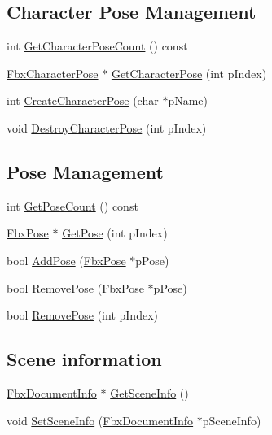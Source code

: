 \subsection*{Character Pose Management}
\begin{DoxyCompactItemize}
\item 
int \hyperlink{class_fbx_scene_a172e1ef47648e5271fc5f7c19e66692f}{Get\+Character\+Pose\+Count} () const
\item 
\hyperlink{class_fbx_character_pose}{Fbx\+Character\+Pose} $\ast$ \hyperlink{class_fbx_scene_a5e8a233241054d2bbe551fec35f7afb6}{Get\+Character\+Pose} (int p\+Index)
\item 
int \hyperlink{class_fbx_scene_aec8727602ce4d2a91448cc42c083e5a3}{Create\+Character\+Pose} (char $\ast$p\+Name)
\item 
void \hyperlink{class_fbx_scene_ac7c105c120c3df3e757354e843c027f1}{Destroy\+Character\+Pose} (int p\+Index)
\end{DoxyCompactItemize}
\subsection*{Pose Management}
\begin{DoxyCompactItemize}
\item 
int \hyperlink{class_fbx_scene_a0bfae5c6b969cfc49a7b0e3c9e190240}{Get\+Pose\+Count} () const
\item 
\hyperlink{class_fbx_pose}{Fbx\+Pose} $\ast$ \hyperlink{class_fbx_scene_a9148979d7728e7256be7ce52cb100558}{Get\+Pose} (int p\+Index)
\item 
bool \hyperlink{class_fbx_scene_a41080e786745c1ebdc1c86a80a8e7961}{Add\+Pose} (\hyperlink{class_fbx_pose}{Fbx\+Pose} $\ast$p\+Pose)
\item 
bool \hyperlink{class_fbx_scene_ad698fe1d231041b3a8ecf5ae3d1e2e86}{Remove\+Pose} (\hyperlink{class_fbx_pose}{Fbx\+Pose} $\ast$p\+Pose)
\item 
bool \hyperlink{class_fbx_scene_a480cd0951e983a20ae2014a981054db6}{Remove\+Pose} (int p\+Index)
\end{DoxyCompactItemize}
\subsection*{Scene information}
\begin{DoxyCompactItemize}
\item 
\hyperlink{class_fbx_document_info}{Fbx\+Document\+Info} $\ast$ \hyperlink{class_fbx_scene_a5af52a77f2053fae74477261f857a0d8}{Get\+Scene\+Info} ()
\item 
void \hyperlink{class_fbx_scene_a486c147dc25d9bec4938852d2550cb81}{Set\+Scene\+Info} (\hyperlink{class_fbx_document_info}{Fbx\+Document\+Info} $\ast$p\+Scene\+Info)
\end{DoxyCompactItemize}
